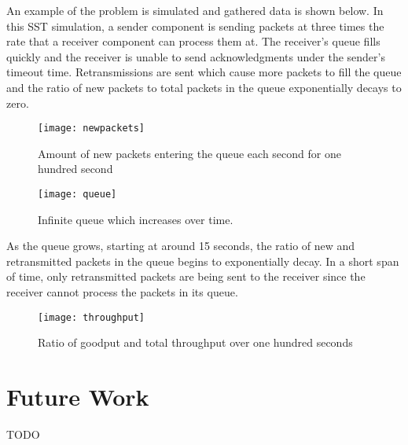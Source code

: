 \documentclass{article}
\begin{document}

An example of the problem is simulated and gathered data is shown below. In this SST simulation, a sender component is sending packets at three times the rate that a receiver component can process them at. The receiver's queue fills quickly and the receiver is unable to send acknowledgments under the sender's timeout time. Retransmissions are sent which cause more packets to fill the queue and the ratio of new packets to total packets in the queue exponentially decays to zero.

\begin{figure}[H]
	\texttt{[image: newpackets]}
	\centering
	\caption{Amount of new packets entering the queue each second for one hundred second}
\end{figure}

\begin{figure}[H]
	\texttt{[image: queue]}
	\centering
	\caption{Infinite queue which increases over time.}
\end{figure}

As the queue grows, starting at around 15 seconds, the ratio of new and retransmitted packets in the queue begins to exponentially decay. In a short span of time, only retransmitted packets are being sent to the receiver since the receiver cannot process the packets in its queue.

\begin{figure}[H]
	\texttt{[image: throughput]}
	\centering
	\caption{Ratio of goodput and total throughput over one hundred seconds}
\end{figure}

\section{Future Work}
TODO
\end{document}
